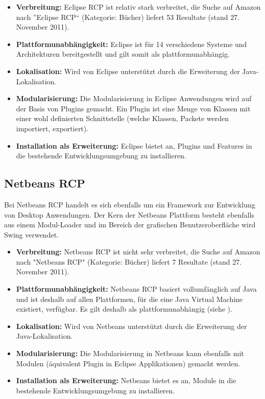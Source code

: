 \begin{itemize}
\item \textbf{Verbreitung:} Eclipse RCP ist relativ stark verbreitet, die Suche auf Amazon nach ''Eclipse RCP`` (Kategorie: Bücher) liefert 53 Resultate (stand 27. November 2011).
\item \textbf{Plattformunabhängigkeit:} Eclipse ist für 14 verschiedene Systeme und Architekturen bereitgestellt und gilt somit als plattformunabhängig\cite{wiki:eclipse}.
\item \textbf{Lokalisation:} Wird von Eclipse unterstützt durch die Erweiterung der Java-Lokalisation.
\item \textbf{Modularisierung:} Die Modularisierung in Eclipse Anwendungen wird auf der Basis von Plugins gemacht. Ein Plugin ist eine Menge von Klassen mit einer wohl definierten Schnittstelle (welche Klassen, Packete werden importiert, exportiert).
\item \textbf{Installation als Erweiterung:} Eclipse bietet an, Plugins und Features in die bestehende Entwicklungsumgebung zu installieren.
\end{itemize}

\subsection{Netbeans RCP}
Bei Netbeans RCP handelt es sich ebenfalls um ein Framework zur Entwicklung von Desktop Anwendungen. Der Kern der Netbeans Plattform besteht ebenfalls aus einem Modul-Loader und im Bereich der grafischen Benutzeroberfläche wird Swing verwendet. 
\begin{itemize}
\item \textbf{Verbreitung:} Netbeans RCP ist nicht sehr verbreitet, die Suche auf Amazon nach "Netbeans RCP" (Kategorie: Bücher) liefert 7 Resultate (stand 27. November 2011).
\item \textbf{Plattformunabhängigkeit:} Netbeans RCP basiert vollumfänglich auf Java und ist deshalb auf allen Plattformen, für die eine Java Virtual Machine existiert, verfügbar. Es gilt deshalb als plattformunabhängig (siehe \cite{wiki:netbeans}).
\item \textbf{Lokalisation:} Wird von Netbeans unterstützt durch die Erweiterung der Java-Lokalisation.
\item \textbf{Modularisierung:} Die Modularisierung in Netbeans kann ebenfalls mit Modulen (äquivalent Plugin in Eclipse Applikationen) gemacht werden.
\item \textbf{Installation als Erweiterung:} Netbeans bietet es an, Module in die bestehende Entwicklungsumgebung zu installieren.
\end{itemize}

